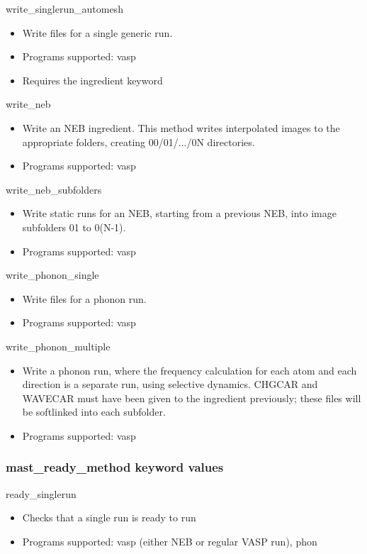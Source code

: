 \documentclass[letterpaper,10pt,english]{sphinxmanual}
\begin{document}
write\_singlerun\_automesh
\begin{itemize}
\item {} 
Write files for a single generic run.

\item {} 
Programs supported: vasp

\item {} 
Requires the  ingredient keyword

\end{itemize}

write\_neb
\begin{itemize}
\item {} 
Write an NEB ingredient. This method writes interpolated images to the appropriate folders, creating 00/01/.../0N directories.

\item {} 
Programs supported: vasp

\end{itemize}

write\_neb\_subfolders
\begin{itemize}
\item {} 
Write static runs for an NEB, starting from a previous NEB, into image subfolders 01 to 0(N-1).

\item {} 
Programs supported: vasp

\end{itemize}

write\_phonon\_single
\begin{itemize}
\item {} 
Write files for a phonon run.

\item {} 
Programs supported: vasp

\end{itemize}

write\_phonon\_multiple
\begin{itemize}
\item {} 
Write a phonon run, where the frequency calculation for each atom and each direction is a separate run, using selective dynamics. CHGCAR and WAVECAR must have been given to the ingredient previously; these files will be softlinked into each subfolder.

\item {} 
Programs supported: vasp

\end{itemize}


\subsubsection{mast\_ready\_method keyword values}
\label{3_0_inputfile:mast-ready-method-keyword-values}
ready\_singlerun
\begin{itemize}
\item {} 
Checks that a single run is ready to run

\item {} 
Programs supported: vasp (either NEB or regular VASP run), phon

\end{itemize}
\end{document}
